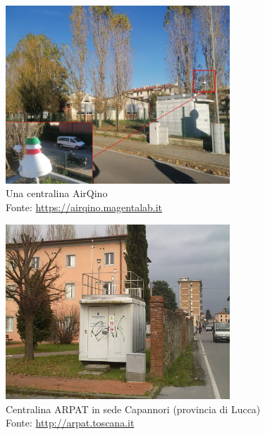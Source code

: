 \begin{figure}[H]
\centering
\captionsetup{justification=centering}
\includegraphics[width=0.75\textwidth,height=\textheight,keepaspectratio]{img/smart72.jpg}
\caption{Una centralina AirQino\\Fonte: \url{https://airqino.magentalab.it}}
\label{fig:smart72}
\end{figure}

\begin{figure}[H]
\centering
\captionsetup{justification=centering}
\includegraphics[width=0.75\textwidth,height=\textheight,keepaspectratio]{img/lu-capannori.jpg}
\caption{Centralina ARPAT in sede Capannori (provincia di Lucca)\\Fonte: \url{http://arpat.toscana.it}}
\label{fig:capannori}
\end{figure}

